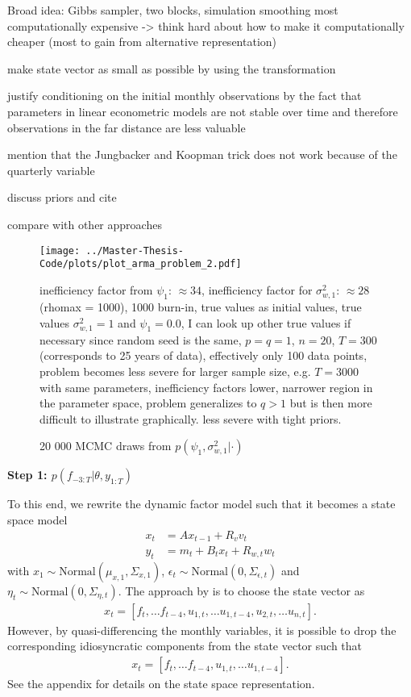 Broad idea: Gibbs sampler, two blocks, simulation smoothing most computationally expensive -> think hard about how to make it computationally cheaper (most to gain from alternative representation)

make state vector as small as possible by using the transformation

justify conditioning on the initial monthly observations by the fact that parameters in linear econometric models are not stable over time and therefore observations in the far distance are less valuable

mention that the Jungbacker and Koopman trick does not work because of the quarterly variable

discuss priors and cite \citet{BaiWang2015}

compare with other approaches

\begin{figure}[tb]
	\texttt{[image: ../Master-Thesis-Code/plots/plot\_arma\_problem\_2.pdf]}
	\caption{20 000 MCMC draws from $p(\psi_1, \sigma^2_{w,1}|\cdot)$}
	\small inefficiency factor from $\psi_1$: $\approx 34$, inefficiency factor for $\sigma^2_{w,1}$: $\approx 28$ (rhomax = 1000), 1000 burn-in, true values as initial values, true values $\sigma^2_{w,1}=1$ and $\psi_1=0.0$, I can look up other true values if necessary since random seed is the same, $p=q=1$, $n=20$, $T=300$ (corresponds to 25 years of data), effectively only 100 data points, problem becomes less severe for larger sample size, e.g. $T=3000$ with same parameters, inefficiency factors lower, narrower region in the parameter space, problem generalizes to $q>1$ but is then more difficult to illustrate graphically. less severe with tight priors.
	\label{fig:arma_problem}
\end{figure}

\textbf{Step 1: $p(f_{-3:T}|\theta, y_{1:T})$}

To this end, we rewrite the dynamic factor model such that it becomes a state space model
\begin{align}
\label{eqn:ssm_obs}
x_t &= A x_{t-1} + R_v v_t \\
y_t &= m_t + B_t x_t + R_{w,t} w_t
\end{align}
with $x_1\sim \mathrm{Normal}(\mu_{x,1}, \Sigma_{x,1})$, $\epsilon_t\sim \mathrm{Normal}(0, \Sigma_{\epsilon,t})$ and $\eta_t\sim \mathrm{Normal}(0, \Sigma_{\eta,t})$. The approach by \citet{MarcellinoEtal2016} is to choose the state vector as 
\begin{align}
x_t = [f_t, \dots f_{t-4}, u_{1,t}, \dots u_{1, t-4}, u_{2,t}, \dots u_{n,t}].
\end{align}
However, by quasi-differencing the monthly variables, it is possible to drop the corresponding idiosyncratic components from the state vector such that 
\begin{align}
x_t = [f_t, \dots f_{t-4}, u_{1,t}, \dots u_{1, t-4}]. 
\end{align}
See the appendix for details on the state space representation. \\

